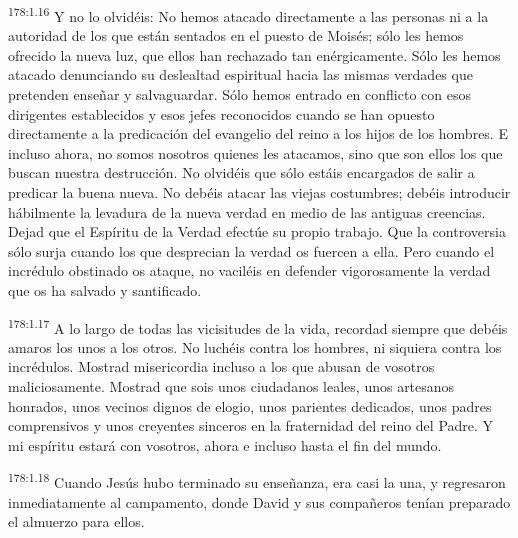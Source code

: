 \par 
\textsuperscript{178:1.16} Y no lo olvidéis: No hemos atacado directamente a las personas ni a la autoridad de los que están sentados en el puesto de Moisés; sólo les hemos ofrecido la nueva luz, que ellos han rechazado tan enérgicamente. Sólo les hemos atacado denunciando su deslealtad espiritual hacia las mismas verdades que pretenden enseñar y salvaguardar. Sólo hemos entrado en conflicto con esos dirigentes establecidos y esos jefes reconocidos cuando se han opuesto directamente a la predicación del evangelio del reino a los hijos de los hombres. E incluso ahora, no somos nosotros quienes les atacamos, sino que son ellos los que buscan nuestra destrucción. No olvidéis que sólo estáis encargados de salir a predicar la buena nueva. No debéis atacar las viejas costumbres; debéis introducir hábilmente la levadura de la nueva verdad en medio de las antiguas creencias. Dejad que el Espíritu de la Verdad efectúe su propio trabajo. Que la controversia sólo surja cuando los que desprecian la verdad os fuercen a ella. Pero cuando el incrédulo obstinado os ataque, no vaciléis en defender vigorosamente la verdad que os ha salvado y santificado.

\par 
\textsuperscript{178:1.17} A lo largo de todas las vicisitudes de la vida, recordad siempre que debéis amaros los unos a los otros. No luchéis contra los hombres, ni siquiera contra los incrédulos. Mostrad misericordia incluso a los que abusan de vosotros maliciosamente. Mostrad que sois unos ciudadanos leales, unos artesanos honrados, unos vecinos dignos de elogio, unos parientes dedicados, unos padres comprensivos y unos creyentes sinceros en la fraternidad del reino del Padre. Y mi espíritu estará con vosotros, ahora e incluso hasta el fin del mundo.

\par 
\textsuperscript{178:1.18} Cuando Jesús hubo terminado su enseñanza, era casi la una, y regresaron inmediatamente al campamento, donde David y sus compañeros tenían preparado el almuerzo para ellos.

